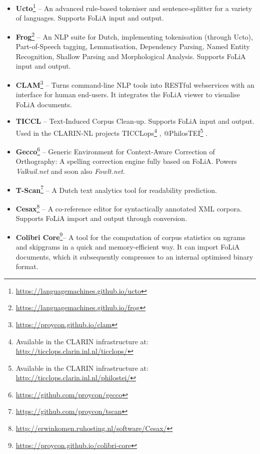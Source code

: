 \documentclass[a4paper,11pt]{article}
\begin{document}
{\begin{itemize}
\item \textbf{\textbf{Ucto}}\footnote{\url{https://languagemachines.github.io/ucto}} -- An advanced rule-based tokeniser and sentence-splitter for a variety of
    languages. Supports FoLiA
    input and output. \cite{UCTO}
\item \textbf{\textbf{Frog}}\footnote{\url{https://languagemachines.github.io/frog}} -- An NLP suite for Dutch, implementing tokenisation (through
    Ucto), Part-of-Speech tagging, Lemmatisation, Dependency Parsing, Named
    Entity Recognition, Shallow Parsing and Morphological Analysis. Supports
    FoLiA input and output.
\item \textbf{\textbf{CLAM}}\footnote{\url{https://proycon.github.io/clam}} -- Turns command-line NLP tools into RESTful webservices with an
    interface for human end-users. It integrates the FoLiA viewer to visualise
    FoLiA documents. \cite{CLAM}
\item \textbf{\textbf{TICCL}} -- Text-Induced Corpus Clean-up. Supports FoLiA
    input and output. Used in the
    CLARIN-NL projects TICCLops\footnote{Available in the CLARIN infrastructure at: \url{http://ticclops.clarin.inl.nl/ticclops/}} \cite{Reynaert2010}, @PhilosTEI\footnote{Available in the CLARIN infrastructure at: \url{http://ticclops.clarin.inl.nl/philostei/}} \cite{Reynaert2014b}. 
\item \textbf{\textbf{Gecco}}\footnote{\url{https://github.com/proycon/gecco}}  -- Generic Environment for Context-Aware Correction
    of Orthography: A spelling correction engine fully based on FoLiA. Powers
    \emph{Valkuil.net} and soon also \emph{Fowlt.net}.
\item \textbf{\textbf{T-Scan}}\footnote{\url{https://github.com/proycon/tscan}} -- A Dutch text analytics tool for readability
    prediction. \cite{TSCAN}
\item \textbf{\textbf{Cesax}}\footnote{\url{http://erwinkomen.ruhosting.nl/software/Cesax/}} -- A co-reference editor for syntactically annotated XML corpora.
    Supports FoLiA import and output through conversion. 
\item \textbf{\textbf{Colibri Core}}\footnote{\url{https://proycon.github.io/colibri-core}}-- A tool for the computation
    of corpus statistics on ngrams and skipgrams in a quick and
    memory-efficient way. It can import FoLiA documents, which it subsequently
    compresses to an internal optimised binary format.
\end{itemize}

}
\end{document}
